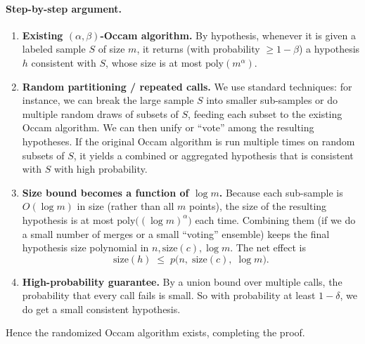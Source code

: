 \documentclass[11pt]{article}
\DeclareMathOperator{\1}{\mathbbm{1}}
\begin{document}
\paragraph{Step-by-step argument.}
\begin{enumerate}
\item \textbf{Existing $(\alpha,\beta)$-Occam algorithm.}  
  By hypothesis, whenever it is given a labeled sample $S$ of size $m$, it returns (with probability $\ge 1-\beta$) a hypothesis $h$ consistent with $S$, whose size is at most $\text{poly}(m^\alpha)$. 
  
\item \textbf{Random partitioning / repeated calls.}  
  We use standard techniques: for instance, we can break the large sample $S$ into smaller sub-samples or do multiple random draws of subsets of $S$, feeding each subset to the existing Occam algorithm.  We can then unify or “vote” among the resulting hypotheses.  If the original Occam algorithm is run multiple times on random subsets of $S$, it yields a combined or aggregated hypothesis that is consistent with $S$ with high probability.

\item \textbf{Size bound becomes a function of $\log m$.}  
  Because each sub-sample is $O(\log m)$ in size (rather than all $m$ points), the size of the resulting hypothesis is at most $\text{poly}\bigl((\log m)^\alpha\bigr)$ each time.  Combining them (if we do a small number of merges or a small “voting” ensemble) keeps the final hypothesis size polynomial in $n,\text{size}(c),\log m$.  The net effect is 
  \[
  \text{size}(h) \;\le\; p\bigl(n,\;\text{size}(c),\;\log m\bigr).
  \]

\item \textbf{High-probability guarantee.}  
  By a union bound over multiple calls, the probability that every call fails is small.  So with probability at least $1-\delta$, we do get a small consistent hypothesis. 

\end{enumerate}

Hence the randomized Occam algorithm exists, completing the proof.

\end{document}
